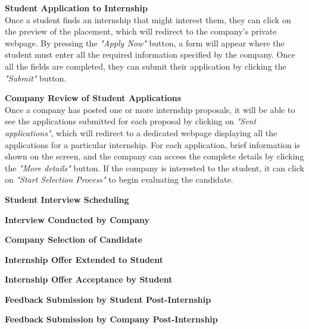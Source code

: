 \begin{enumerate}[label=\textbf{[\arabic*]}, left = 0 pt, align = left]
\item \textbf{Student Application to Internship}                      
\\Once a student finds an internship that might interest them, they can click on the preview of the placement, which will redirect to the company's private webpage. By pressing the \textit{"Apply Now"} button, a form will appear where the student must enter all the required information specified by the company. Once all the fields are completed, they can submit their application by clicking the \textit{"Submit"} button.

\item \textbf{Company Review of Student Applications}                
\\Once a company has posted one or more internship proposals, it will be able to see the applications submitted for each proposal by clicking on \textit{"Sent applications"}, which will redirect to a dedicated webpage displaying all the applications for a particular internship. For each application, brief information is shown on the screen, and the company can access the complete details by clicking the \textit{"More details"} button. If the company is interested to the student, it can click on \textit{"Start Selection Process"} to begin evaluating the candidate.

\item \textbf{Student Interview Scheduling}                          
\\


\item \textbf{Interview Conducted by Company}                        
\\


\item \textbf{Company Selection of Candidate}                        
\\


\item \textbf{Internship Offer Extended to Student}                  
\\


\item \textbf{Internship Offer Acceptance by Student}                
\\


\item \textbf{Feedback Submission by Student Post-Internship}        
\\


\item \textbf{Feedback Submission by Company Post-Internship}        
\\



\end{enumerate}

